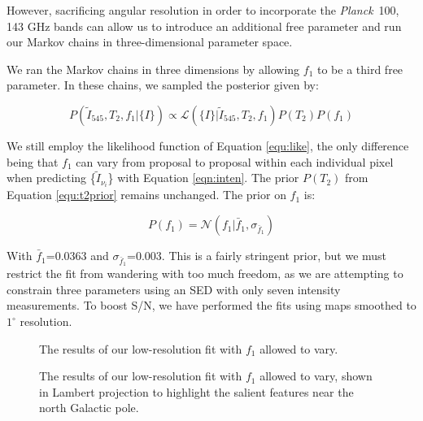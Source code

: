 \documentclass{emulateapj}
\newcommand{\PLANCK}{{\it Planck}}
\begin{document}

However, sacrificing angular resolution in order to incorporate 
the \PLANCK~100, 143 GHz bands can allow us to introduce an additional free 
parameter and run our Markov chains in three-dimensional parameter space.

We ran the Markov chains in three dimensions by allowing 
$f_1$ to be a third free parameter. In these chains, we sampled the posterior
given by:

\begin{equation}
\label{eqn:f1post}
P(\tilde{I}_{545}, T_2, f_1|\{I\}) \propto \mathcal{L}(\{I\}|\tilde{I}_{545}, T_2, f_1)P(T_2)P(f_1)
\end{equation}

We still employ the likelihood function of Equation \ref{equ:like}, the only
difference being that $f_1$ can vary from proposal to proposal within each 
individual pixel when predicting \{$\tilde{I}_{\nu_i}$\} with Equation 
\ref{eqn:inten}. The prior $P(T_2)$ from Equation \ref{equ:t2prior} remains 
unchanged. The prior on $f_1$ is:

\begin{equation} \label{equ:f1prior}
P(f_1) = \mathcal{N}(f_1|\bar{f}_1, \sigma_{\bar{f}_1})
\end{equation}

With $\bar{f}_1$=0.0363 and $\sigma_{\bar{f}_1}$=0.003. This is a fairly
stringent prior, but we must restrict the fit from wandering with too much
freedom, as we are attempting to constrain three parameters using an SED
with only seven intensity measurements. To boost S/N, we have performed
the fits using maps smoothed to $1^{\circ}$ resolution.

\begin{figure}
\begin{center}
\caption{\label{fig:f1} The results of our low-resolution fit with $f_1$
allowed to vary.}
\end{center}
\end{figure}

\begin{figure}
\begin{center}
\caption{\label{fig:f1lambert} The results of our low-resolution fit with $f_1$
allowed to vary, shown in Lambert projection to highlight the salient features 
near the north Galactic pole.}
\end{center}
\end{figure}
\end{document}

